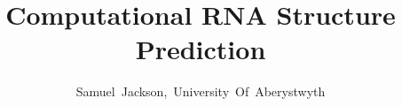 \documentclass[journal]{IEEEtran}
\begin{document}
%
\title{Computational RNA Structure Prediction}
%
%
%

\author{Samuel~Jackson,~University~Of~Aberystwyth}

% 
%



% 
\end{document}
